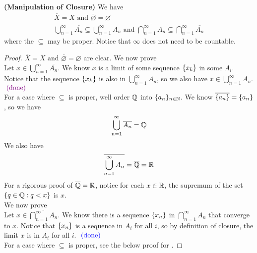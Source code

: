 \documentclass{report}
\begin{document}
\begin{theorem}
\label{3.2.3}
\textbf{(Manipulation of Closure)} We have
\begin{gather}
\overline{X}=X\text{ and }\overline{\varnothing}=\varnothing\\
\bigcup_{n=1}^\infty \overline{A_n}\subseteq \overline{\bigcup_{n=1}^\infty A_n}\text{ and }\overline{\bigcap_{n=1}^\infty A_n}\subseteq \bigcap_{n=1}^\infty \overline{A_n} 
\end{gather}
where the $\subseteq$ may be proper. Notice that $\infty$ does not need to be countable. 
\end{theorem}
\begin{proof}
$\overline{X}=X\text{ and }\overline{\varnothing}=\varnothing$ are clear. We now prove  \\

Let $x\in \bigcup_{n=1}^\infty \overline{A_n}$. We know $x$ is a limit of some sequence $\{ x_k \}$ in some $A_i$. Notice that the sequence $\{ x_k \}$ is also in $\bigcup_{n=1}^\infty A_n$, so we also have $x\in \overline{\bigcup_{n=1}^\infty A_n}$. $\textcolor{violet}{\text{ (done) }}$\\

For a case where $\subseteq$ is proper, well order $\mathbb{Q}$ into $\{ a_n \}_{n\in\mathbb{N}}$. We know $\overline{\{ a_n \}}=\{ a_n \}$, so we have
\begin{equation}
\bigcup _{n=1}^\infty \overline{A_n}=\mathbb{Q} 
\end{equation}
We also have
\begin{equation}
\overline{\bigcup_{n=1}^\infty A_n}=\overline{\mathbb{Q}}=\mathbb{R}
\end{equation}
For a rigorous proof of $\overline{\mathbb{Q}}=\mathbb{R}$, notice for each $x\in\mathbb{R}$, the supremum of the set $\{ q\in\mathbb{Q}: q<x \}$ is $x$.\\

We now prove \\

Let $x\in \overline{\bigcap _{n=1}^\infty A_n}$. We know there is a sequence $\{ x_n \}$ in $\bigcap _{n=1}^\infty A_n$ that converge to $x$. Notice that $\{ x_n \}$ is a sequence in $A_i$ for all  $i$, so by definition of closure, the limit  $x$ is in  $\overline{A_i}$ for all $i$. $\textcolor{blue}{\text{ (done) }}$\\

For a case where $\subseteq$ is proper, see the below proof for .
\end{proof}
\end{document}
